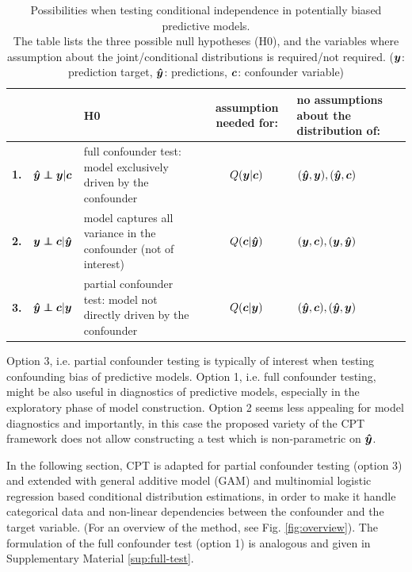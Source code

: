 \documentclass{article}
\begin{document}
\renewcommand{\arraystretch}{1.2}
\begin{table}[]
\centering
\begin{tabular}{l|rp{60mm}|c|>{\centering\arraybackslash}m{30mm}}
 &  & H0  & assumption needed for: & no assumptions about the distribution of: \\
\hline
\textbf{1.} & $\yhat \independent \y | \c$ \quad  & full confounder test: model exclusively driven by the confounder & $Q(\boldsymbol{y}|\boldsymbol{c})$ & $(\boldsymbol{\hat{y}},\boldsymbol{y}), (\boldsymbol{\hat{y}}, \boldsymbol{c})$ \\
\textbf{2.} & $\y \independent \c | \yhat$ \quad & model captures all variance in the confounder (not of interest) & $Q(\boldsymbol{c}|\boldsymbol{\hat{y}})$ & $(\boldsymbol{y}, \boldsymbol{c}), (\boldsymbol{y}, \boldsymbol{\hat{y}})$ \\
\textbf{3.} & $\yhat \independent \c | \y$  \quad &  partial confounder  test: model not directly driven by the confounder & $Q(\boldsymbol{c}|\boldsymbol{y})$ & $(\boldsymbol{\hat{y}}, \boldsymbol{c}), (\boldsymbol{\hat{y}}, \boldsymbol{y})$ \\
\end{tabular}
\caption{\label{tab:conditional-independence-cases} Possibilities when testing conditional independence in potentially biased predictive models. \\The table lists the three possible null hypotheses (H0), and the variables where assumption about the joint/conditional distributions is required/not required.   ($\boldsymbol{y}$: prediction target, $\boldsymbol{\hat{y}}$: predictions, $\boldsymbol{c}$: confounder variable) }
\end{table}

Option 3, i.e. partial confounder testing is typically of interest when testing confounding bias of predictive models. Option 1, i.e. full confounder testing, might be also useful in diagnostics of predictive models, especially in the exploratory phase of model construction. Option 2 seems less appealing for model diagnostics and importantly, in this case the proposed variety of the CPT framework does not allow constructing a test which is non-parametric on $\boldsymbol{\hat{y}}$.

In the following section, CPT is adapted for partial confounder testing (option 3) and extended with general additive model\cite{hastie1987generalized} (GAM) and multinomial logistic regression\citep{bennett1966multiple, jones1975proability} based conditional distribution estimations, in order to make it handle categorical data and non-linear dependencies between the confounder and the target variable. (For an overview of the method, see Fig. \ref{fig:overview}). The formulation of the full confounder test (option 1) is analogous and given in Supplementary Material \ref{sup:full-test}.
\end{document}
